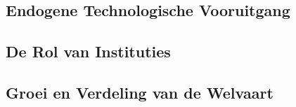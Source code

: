 \subsection{Endogene Technologische Vooruitgang}

\subsection{De Rol van Instituties}

\subsection{Groei en Verdeling van de Welvaart}
